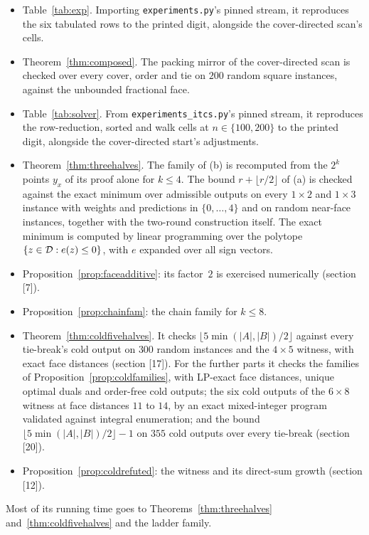 \begin{itemize}
\item Table~\ref{tab:exp}. Importing \texttt{experiments.py}'s pinned stream, it reproduces the six
tabulated rows to the printed digit, alongside the cover-directed scan's cells.
\item Theorem~\ref{thm:composed}. The packing mirror of the cover-directed scan is checked over
every cover, order and tie on $200$ random square instances, against the unbounded fractional face.
\item Table~\ref{tab:solver}. From \texttt{experiments\_itcs.py}'s pinned stream, it reproduces
the row-reduction, sorted and walk cells at $n \in \{100, 200\}$ to the printed digit, alongside the
cover-directed start's adjustments.
\item Theorem~\ref{thm:threehalves}. The family of (b) is recomputed from the $2^k$ points $y_x$ of its proof
alone for $k \le 4$. The bound $r + \lfloor r/2 \rfloor$ of (a) is checked against the exact
minimum over admissible outputs on every $1 \times 2$ and $1 \times 3$ instance with weights and
predictions in $\{0, \dots, 4\}$ and on random near-face instances, together with the two-round
construction itself. The exact minimum is computed by linear programming over the polytope
$\{z \in \mathcal{D} : e(z) \le 0\}$, with $e$ expanded over all sign vectors.
\item Proposition~\ref{prop:faceadditive}: its factor~$2$ is exercised numerically (section [7]).
\item Proposition~\ref{prop:chainfam}: the chain family for $k \le 8$.
\item Theorem~\ref{thm:coldfivehalves}. It checks $\lfloor 5\min(|A|,|B|)/2 \rfloor$ against every
tie-break's cold output on $300$ random instances and the $4 \times 5$ witness, with exact face distances
(section [17]). For the further parts it checks the families of
Proposition~\ref{prop:coldfamilies}, with LP-exact face distances, unique optimal duals and
order-free cold outputs; the six cold outputs of the $6 \times 8$ witness at face distances $11$ to
$14$, by an exact mixed-integer program validated against integral enumeration; and the bound
$\lfloor 5\min(|A|,|B|)/2 \rfloor - 1$ on $355$ cold outputs over every tie-break (section [20]).
\item Proposition~\ref{prop:coldrefuted}: the witness and its direct-sum growth (section [12]).
\end{itemize}
Most of its running time goes to Theorems~\ref{thm:threehalves} and~\ref{thm:coldfivehalves} and the ladder family.


